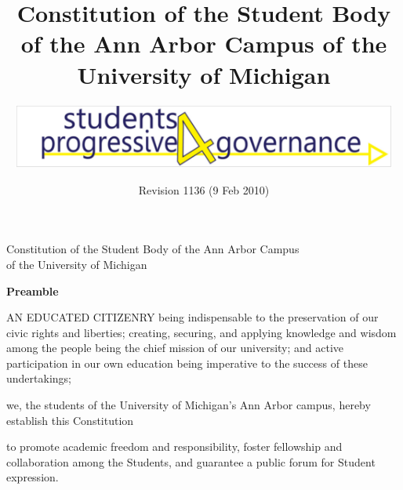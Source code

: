 \documentclass{constitution}
\begin{document}
	\renewcommand{\thepage}{\roman{page}}
	\title{Constitution of the Student Body of the Ann Arbor Campus of the University of Michigan}
	\author{\includegraphics[width=5in]{S4PGlogo}}
	\date{Revision 1136 (9 Feb 2010)}
	\maketitle
	\tableofcontents
	\newpage

	\renewcommand{\thepage}{\arabic{page}}
	\setcounter{page}{1}
	\pagestyle{fancy}
	\headheight 35pt
	\linenumbers
	
	\begin{center}
		\Large Constitution of the Student Body of the Ann Arbor Campus\\ of the University of Michigan
	\end{center}
	
	\begin{center}
		\bfseries Preamble
	\end{center}

	AN EDUCATED CITIZENRY being indispensable to the preservation of our civic rights and liberties; creating, securing, and applying knowledge and wisdom among the people being the chief mission of our university; and active participation in our own education being imperative to the success of these undertakings;

	    we, the students of the University of Michigan's Ann Arbor campus, hereby establish this Constitution

	to promote academic freedom and responsibility, foster fellowship and collaboration among the Students, and guarantee a public forum for Student expression.
	

	

	
	
	
	
	
	
	
	
	
	

	
	
	
\end{document}
